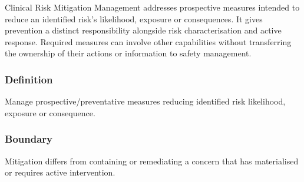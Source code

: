 Clinical Risk Mitigation Management addresses prospective measures intended to reduce an identified risk's likelihood, exposure or consequences. It gives prevention a distinct responsibility alongside risk characterisation and active response. Required measures can involve other capabilities without transferring the ownership of their actions or information to safety management.

\subsubsection*{Definition}

Manage prospective/\allowbreak{}preventative measures reducing identified risk likelihood, exposure or consequence.

\subsubsection*{Boundary}

Mitigation differs from containing or remediating a concern that has materialised or requires active intervention.

